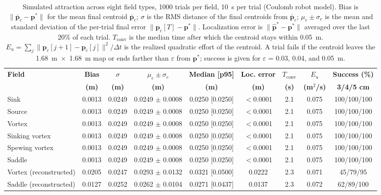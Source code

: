 \begin{table}[!t]
\centering
\footnotesize
\caption{Simulated attraction across eight field types, 1000 trials per field, 10~s per trial (Coulomb robot model). Bias is $\|\bar{\mathbf{p}}_c - \mathbf{p}^*\|$ for the mean final centroid $\bar{\mathbf{p}}_c$; $\sigma$ is the RMS distance of the final centroids from $\bar{\mathbf{p}}_c$; $\mu_e \pm \sigma_e$ is the mean and standard deviation of the per-trial final error $\|\mathbf{p}_c[T] - \mathbf{p}^*\|$. Localization error is $\|\hat{\mathbf{p}}^* - \mathbf{p}^*\|$ averaged over the last 20\% of each trial. $T_{\mathrm{conv}}$ is the median time after which the centroid stays within 0.05~m. $E_u = \sum_j \|\mathbf{p}_c[j+1] - \mathbf{p}_c[j]\|^2/\Delta t$ is the realized quadratic effort of the centroid. A trial fails if the centroid leaves the 1.68~m~$\times$~1.68~m map or ends farther than $\varepsilon$ from $\mathbf{p}^*$; success is given for $\varepsilon$ = 0.03, 0.04, and 0.05~m.}
\label{tab:simulation_estimation_results}
\setlength{\tabcolsep}{4pt}
\begin{tabular}{lcccccccc}
\hline
\textbf{Field} & \textbf{Bias} & \textbf{$\sigma$} & \textbf{$\mu_e \pm \sigma_e$} & \textbf{Median [p95]} & \textbf{Loc. error} & \textbf{$T_{\mathrm{conv}}$} & \textbf{$E_u$} & \textbf{Success (\%)} \\
 & \textbf{(m)} & \textbf{(m)} & \textbf{(m)} & \textbf{(m)} & \textbf{(m)} & \textbf{(s)} & \textbf{(m$^2$/s)} & \textbf{3/4/5 cm} \\
\hline
Sink & 0.0013 & 0.0249 & 0.0249 $\pm$ 0.0008 & 0.0250 [0.0250] & $<$0.0001 & 2.1 & 0.075 & 100/100/100 \\
Source & 0.0013 & 0.0249 & 0.0249 $\pm$ 0.0008 & 0.0250 [0.0250] & $<$0.0001 & 2.1 & 0.075 & 100/100/100 \\
Vortex & 0.0013 & 0.0249 & 0.0249 $\pm$ 0.0008 & 0.0250 [0.0250] & $<$0.0001 & 2.1 & 0.075 & 100/100/100 \\
Sinking vortex & 0.0013 & 0.0249 & 0.0249 $\pm$ 0.0008 & 0.0250 [0.0250] & $<$0.0001 & 2.1 & 0.075 & 100/100/100 \\
Spewing vortex & 0.0013 & 0.0249 & 0.0249 $\pm$ 0.0008 & 0.0250 [0.0250] & $<$0.0001 & 2.1 & 0.075 & 100/100/100 \\
Saddle & 0.0013 & 0.0249 & 0.0249 $\pm$ 0.0008 & 0.0250 [0.0250] & $<$0.0001 & 2.1 & 0.075 & 100/100/100 \\
Vortex (reconstructed) & 0.0205 & 0.0247 & 0.0293 $\pm$ 0.0132 & 0.0321 [0.0500] & 0.0222 & 2.3 & 0.071 & 45/79/95 \\
Saddle (reconstructed) & 0.0127 & 0.0252 & 0.0262 $\pm$ 0.0104 & 0.0271 [0.0437] & 0.0137 & 2.3 & 0.072 & 62/89/100 \\
\hline
\end{tabular}
\end{table}
